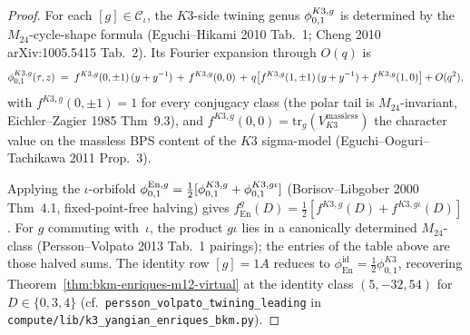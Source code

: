 \begin{proof}[Proof]
For each $[g]\in\mathcal{C}_\iota$, the $K3$-side twining genus $\phi^{K3,g}_{0,1}$
is determined by the $M_{24}$-cycle-shape formula (Eguchi--Hikami 2010
Tab.~1; Cheng 2010 arXiv:1005.5415 Tab.~2). Its Fourier expansion
through $O(q)$ is
\[
 \phi^{K3,g}_{0,1}(\tau, z)
 \;=\;
 f^{K3,g}(0,\pm 1)\,(y + y^{-1})
 \,+\, f^{K3,g}(0,0)
 \,+\, q\bigl[f^{K3,g}(1,\pm 1)\,(y + y^{-1})
 + f^{K3,g}(1,0)\bigr] + O(q^2),
\]
with $f^{K3,g}(0,\pm 1) = 1$ for every conjugacy class (the polar
tail is $M_{24}$-invariant, Eichler--Zagier 1985 Thm~9.3), and
$f^{K3,g}(0,0) = \mathrm{tr}_g(V_{K3}^{\text{massless}})$ the
character value on the massless BPS content of the $K3$ sigma-model
(Eguchi--Ooguri--Tachikawa 2011 Prop.~3).

Applying the $\iota$-orbifold $\phi^{\mathrm{En},g}_{0,1} = \tfrac{1}{2}[\phi^{K3,g}_{0,1} +
\phi^{K3, g\iota}_{0,1}]$ (Borisov--Libgober 2000 Thm~4.1,
fixed-point-free halving) gives
$f^g_{\mathrm{En}}(D) = \tfrac{1}{2}[f^{K3,g}(D) + f^{K3,g\iota}(D)]$.
For $g$ commuting with~$\iota$, the product $g\iota$ lies in a
canonically determined $M_{24}$-class (Persson--Volpato 2013 Tab.~1
pairings); the entries of the table above are those halved
sums. The identity row $[g] = 1A$ reduces to $\phi^{\mathrm{id}}_{\mathrm{En}}
= \tfrac{1}{2}\phi^{K3}_{0,1}$, recovering
Theorem~\ref{thm:bkm-enriques-m12-virtual} at the identity class
$(5, -32, 54)$ for $D\in\{0, 3, 4\}$ (cf.\
\texttt{persson\_volpato\_twining\_leading} in
\texttt{compute/lib/k3\_yangian\_enriques\_bkm.py}).


\end{proof}
